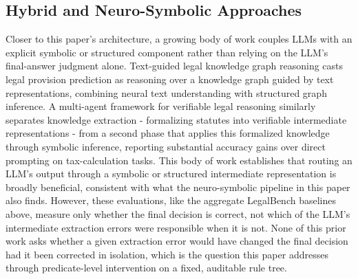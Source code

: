 \subsection{Hybrid and Neuro-Symbolic Approaches}
\label{subsec:related-hybrid}
Closer to this paper's architecture, a growing body of work couples LLMs with an explicit symbolic or structured component rather than relying on the LLM's final-answer judgment alone. Text-guided legal knowledge graph reasoning \cite{li2021legalkg} casts legal provision prediction as reasoning over a knowledge graph guided by text representations, combining neural text understanding with structured graph inference. A multi-agent framework for verifiable legal reasoning \cite{sadowski2025verifiable} similarly separates knowledge extraction - formalizing statutes into verifiable intermediate representations - from a second phase that applies this formalized knowledge through symbolic inference, reporting substantial accuracy gains over direct prompting on tax-calculation tasks. This body of work establishes that routing an LLM's output through a symbolic or structured intermediate representation is broadly beneficial, consistent with what the neuro-symbolic pipeline in this paper also finds. However, these evaluations, like the aggregate LegalBench baselines above, measure only whether the final decision is correct, not which of the LLM's intermediate extraction errors were responsible when it is not. None of this prior work asks whether a given extraction error would have changed the final decision had it been corrected in isolation, which is the question this paper addresses through predicate-level intervention on a fixed, auditable rule tree.
